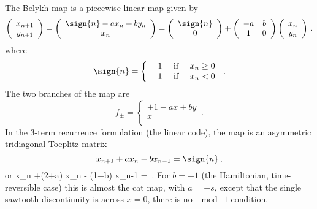 {The Belykh map is a piecewise linear map given by
\[  \left( \begin{array}{c}
        x_{n+1} \\
        y_{n+1} \\
        \end{array}\right)
        = \left(\begin{array}{c}
                    \sign{n} -a x_n + b y_n     \\
                    x_n                         \\
                \end{array} \right)
        =  \left( \begin{array}{c}
            \sign{n} \\
            0        \\
        \end{array}\right)
        +
\left(\begin{array}{cc}
            -a  & b      \\
             1  & 0      \\
                \end{array} \right)
\left( \begin{array}{c}
        x_{n} \\
        y_{n} \\
        \end{array}\right)
\,.\]
where
\[
\sign{n} = \left\{\begin{array}{rcc}
                                1 & \mbox { if } &  x_n \geq 0\\
                                -1 & \mbox { if } &  x_n < 0\\
                                                \end{array} \right.
\,.
\]
The two branches of the map are
\[
f_{\pm} = \left\{\begin{array}{l}
                                \pm 1 -a x + b y\\
                                 x \\
                                                \end{array} \right.
\,.\]
In the 3-term recurrence formulation (the linear code), the map is
an asymmetric tridiagonal Toeplitz matrix
\[
 x_{n+1} +a x_n - b x_{n-1} = \sign{n}
 \,,
\]
or
\beq
\Box x_n +(2+a) x_n - (1+b) x_{n-1} = 
 \,.
For $b=-1$ (the Hamiltonian, time-reversible case) this is almost the cat
map, with $a=-s$, except that the single sawtooth discontinuity is across
$x=0$, there is no $\mod\ 1$ condition.

}
